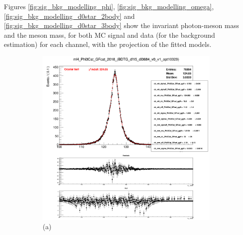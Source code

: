 Figures \ref{fig:sig_bkg_modelling_phi}, \ref{fig:sig_bkg_modelling_omega}, \ref{fig:sig_bkg_modelling_d0star_2body} and \ref{fig:sig_bkg_modelling_d0star_3body} show the invariant photon-meson mass and the meson mass, for both MC signal and data (for the background estimation) for each channel, with the projection of the fitted models.


\begin{figure}[!ht]
    \captionsetup[subfigure]{labelformat=empty}
    \vspace*{-0.2cm}
    \centering
    \setlength{\mylength}{\textwidth}
    \begin{subfigure}[t]{0.50\mylength}
        \centering
        \includegraphics[width=0.45\mylength]{resources/plots/Phi3_fit_SGN_MH.png}
        \caption{\footnotesize (a)}
    \end{subfigure}%
    \begin{subfigure}[t]{0.50\mylength}
        \centering

\end{subfigure}
\end{figure}
